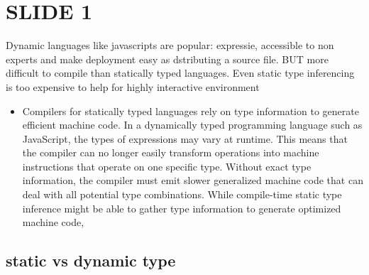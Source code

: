 \documentclass[10pt,oneside]{report}
\begin{document}
\chapter{SLIDE 1}
Dynamic languages like javascripts are popular: expressie, accessible to non
experts and make deployment easy as dstributing a source file.  BUT more
difficult to compile than statically typed languages. Even static type
inferencing is too expensive to help for highly interactive environment


\begin{itemize}
\item Compilers for statically typed languages rely on type information to generate
efficient machine code. In a dynamically typed programming language such as
JavaScript, the types of expressions may vary at runtime. This means that the
compiler can no longer easily transform operations into machine instructions
that operate on one specific type. Without exact type information, the compiler
must emit slower generalized machine code that can deal with all potential type
combinations. 
While compile-time static type inference might be able to
gather type information to generate optimized machine code, 

\end{itemize}

\section{static vs dynamic type}
\end{document}
